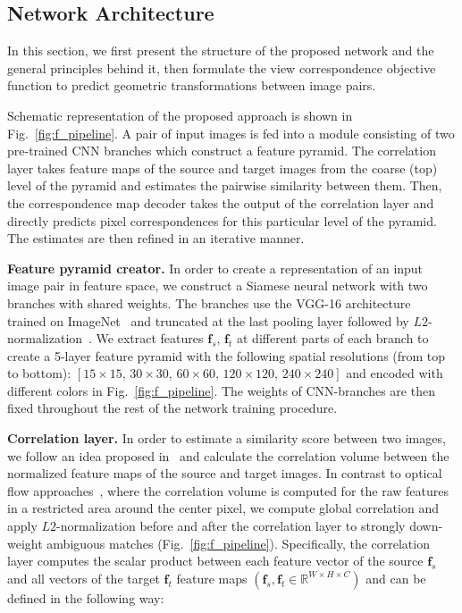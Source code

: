 \documentclass[10pt,twocolumn,letterpaper]{article}
\begin{document}
\subsection{Network Architecture}\label{ssec:net_arch}
In this section, we first present the structure of the proposed network and the general principles behind it, then formulate the view correspondence objective function to predict geometric transformations between image pairs.

Schematic representation of the proposed approach is shown in Fig.~\ref{fig:f_pipeline}. A pair of input images is fed into a module consisting of two pre-trained CNN branches which construct a feature pyramid. The correlation layer takes feature maps of the source and target images from the coarse (top) level of the pyramid and estimates the pairwise similarity between them. Then, the correspondence map decoder takes the output of the correlation layer and directly predicts pixel correspondences for this particular level of the pyramid. The estimates are then refined in an iterative manner. 

\noindent\textbf{Feature pyramid creator.}
In order to create a representation of an input image pair in feature space, we construct a Siamese neural network with two branches with shared weights. The branches use the VGG-16 architecture~\cite{vgg} trained on ImageNet~\cite{imagenet} and truncated at the last pooling layer followed by $L2$-normalization~\cite{Rocco17}. We extract features $\mathbf{f}_{s},\,\mathbf{f}_{t}$ at different parts of each branch to create a 5-layer feature pyramid with the following spatial resolutions (from top to bottom): $\left[15\times15,\,30\times30,\,60\times60,\,120\times120,\, 240\times240\right]$ and encoded with different colors in Fig.~\ref{fig:f_pipeline}. The weights of CNN-branches are then fixed throughout the rest of the network training procedure.

\noindent\textbf{Correlation layer.} In order to estimate a similarity score between two images, we follow an idea proposed in~\cite{Rocco17} and calculate the correlation volume between the normalized feature maps of the source and target images. In contrast to optical flow approaches~\cite{FlowNet2,PWC-Net}, where the correlation volume is computed for the raw features in a restricted area around the center pixel, we compute global correlation and apply $L2$-normalization before and after the correlation layer to strongly down-weight ambiguous matches (\cf Fig.~\ref{fig:f_pipeline}). Specifically, the correlation layer computes the scalar product between each feature vector of the source $\mathbf{f}_{s}$ and all vectors of the target $\mathbf{f}_{t}$ feature maps $\left(\mathbf{f}_{s},\mathbf{f}_{t} \in \mathbb{R}^{W\times H\times C}\right)$ and can be defined in the following way:
\end{document}
